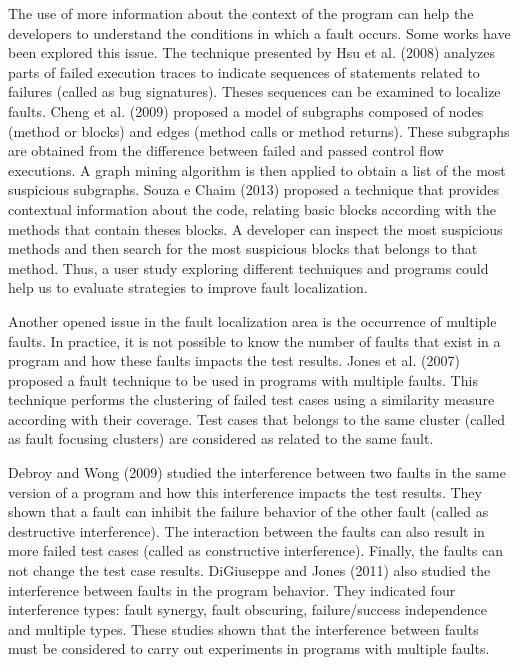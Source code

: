 \documentclass[12pt,a4paper,espaco=umemeio,noindentfirst,oneside,openany,tocpage=plain,pnumromarab,ruledheader,time,anapcustomindent]{sty/abnt}
\begin{document}
The use of more information about the context of the program can help the developers to understand the conditions in which a fault occurs. Some works 
have been explored this issue. The technique presented by Hsu et al. (2008) \cite{hsu2008} analyzes parts of failed execution traces to 
indicate sequences of statements related to failures (called as bug signatures). Theses sequences can be examined to localize faults. 
Cheng et al. (2009) \cite{cheng2009} proposed a model of subgraphs composed of nodes (method or blocks) and edges (method calls or 
method returns). These subgraphs are obtained from the difference between failed and passed control flow executions. 
A graph mining algorithm is then applied to obtain a list of the most suspicious subgraphs. 
Souza e Chaim (2013) \cite{souza2013} proposed a technique that provides contextual information about the code, relating 
basic blocks according with the methods that contain theses blocks. A developer can inspect the most suspicious methods and then search for the most 
suspicious blocks that belongs to that method. 
Thus, a user study exploring different techniques and programs could help us to evaluate strategies to improve fault localization.

Another opened issue in the fault localization area is the occurrence of multiple faults. In practice, it is not possible to know the number of 
faults that exist in a program and how these faults impacts the test results. Jones et al. (2007) \cite{jones2007} proposed a fault technique to 
be used in programs with multiple faults. This technique performs the clustering of failed test cases using a similarity measure according with 
their coverage. Test cases that belongs to the same cluster (called as fault focusing clusters) are considered as related to the same fault. 

Debroy and Wong (2009) \cite{debroy2009} studied the interference between two faults in the same version of a program 
and how this interference impacts the test results. They shown 
that a fault can inhibit the failure behavior of the other fault (called as destructive interference). The interaction between the faults can also 
result in more failed test cases (called as constructive interference).  Finally, the faults can not change the test case results. DiGiuseppe and 
Jones (2011) \cite{digiuseppe2011} also studied the interference between faults in the program behavior. They 
indicated four interference types: fault synergy, fault obscuring, failure/success independence and multiple types. These studies shown that the 
interference between faults must be considered to carry out experiments in programs with multiple faults. 
\end{document}
